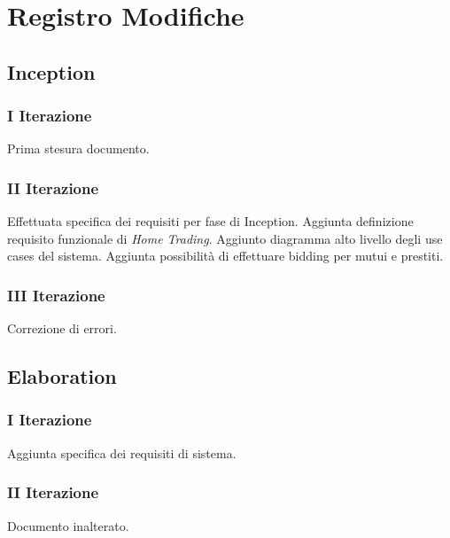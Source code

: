 \documentclass[10pt]{softeng} %
\begin{document}
\startofdocument{}













\appendix

\section{Registro Modifiche}

\subsection{Inception}

\subsubsection{I Iterazione}

Prima stesura documento.

\subsubsection{II Iterazione}

Effettuata specifica dei requisiti per fase di Inception.
Aggiunta definizione requisito funzionale di \emph{Home Trading}.
Aggiunto diagramma alto livello degli use cases del sistema.
Aggiunta possibilit\`a di effettuare bidding per mutui e prestiti.

\subsubsection{III Iterazione}

Correzione di errori.

\subsection{Elaboration}

\subsubsection{I Iterazione}

Aggiunta specifica dei requisiti di sistema.

\subsubsection{II Iterazione}

Documento inalterato.


\printcustombib{}
\end{document}

